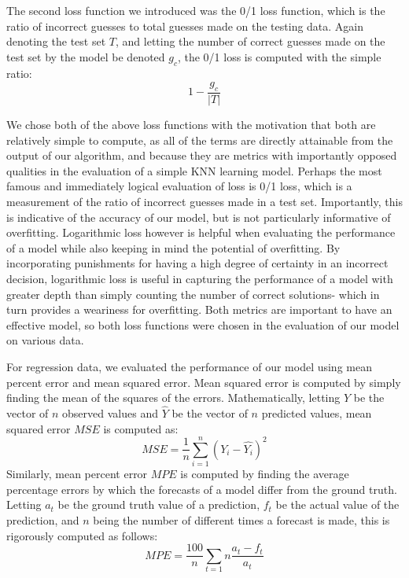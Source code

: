 \documentclass[twoside,11pt]{article}
\begin{document}
The second loss function we introduced was the 0/1 loss function, which is the ratio of incorrect guesses to total guesses made on the testing data.
Again denoting the test set $T$, and letting the number of correct guesses made on the test set by the model be denoted $g_c$, the 0/1 loss is computed with the simple ratio:
\begin{equation}
	1 - \frac{g_c}{|T|}
\end{equation}

We chose both of the above loss functions with the motivation that both are relatively simple to compute, as all of the terms are directly attainable from the output of our algorithm, and
because they are metrics with importantly opposed qualities in the evaluation of a simple KNN learning model. Perhaps the most famous and immediately logical evaluation of loss is 0/1 loss, 
which is a measurement of the ratio of incorrect guesses made in a test set. Importantly, this is indicative of the accuracy of our model, but is not particularly informative of overfitting.
Logarithmic loss however is helpful when evaluating the performance of a model while also keeping in mind the potential of overfitting. By incorporating punishments for having a high degree
of certainty in an incorrect decision, logarithmic loss is useful in capturing the performance of a model with greater depth than simply counting the number of correct solutions- 
which in turn provides a weariness for overfitting.
Both metrics are important to have an effective model, so both loss functions were chosen in the evaluation of our model on various data.

For regression data, we evaluated the performance of our model using mean percent error and mean squared error. Mean squared error is computed by
simply finding the mean of the squares of the errors. Mathematically, letting $Y$ be the vector of $n$ observed values and $\hat{Y}$ be the vector of $n$ predicted
values, mean squared error $MSE$ is computed as:
\begin{equation}
MSE = \frac{1}{n} \sum_{i=1}^{n} (Y_i - \hat{Y_i})^2
\end{equation}
Similarly, mean percent error $MPE$ is computed by finding the average percentage errors by which the forecasts of a model differ from the ground truth. Letting $a_t$ be the 
ground truth value of a prediction, $f_t$ be the actual value of the prediction, and $n$ being the number of different times a forecast is made, this is rigorously
computed as follows:
\begin{equation}
MPE = \frac{100}{n} \sum_{t=1}{n} \frac{a_t - f_t}{a_t}
\end{equation}
\end{document}
